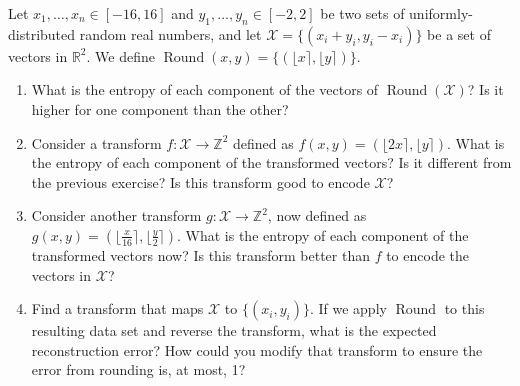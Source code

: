 \begin{exercise}
Let $x_1, \ldots , x_n \in [-16,16]$ and $y_1, \ldots , y_n \in [-2,2]$ be two sets of uniformly-distributed random real numbers, and let $\mathcal{X}=\lbrace (x_i + y_i, y_i - x_i) \rbrace$ be a set of vectors in $\mathbb{R}^2$. We define $\operatorname{Round}(x,y) = \lbrace (\lfloor x \rceil, \lfloor y \rceil ) \rbrace$.
\begin{enumerate}
\item What is the entropy of each component of the vectors of $\operatorname{Round}(\mathcal{X})$? Is it higher for one component than the other?
\item Consider a transform $f : \mathcal{X} \rightarrow \mathbb{Z}^2$ defined as $f(x,y) = (\lfloor 2x \rceil, \lfloor y \rceil)$. What is the entropy of each component of the transformed vectors? Is it different from the previous exercise? Is this transform good to encode $\mathcal{X}$?
\item Consider another transform $g : \mathcal{X} \rightarrow \mathbb{Z}^2$, now defined as $g(x,y) = (\lfloor \frac{x}{16} \rceil, \lfloor \frac{y}{2} \rceil)$. What is the entropy of each component of the transformed vectors now? Is this transform better than $f$ to encode the vectors in $\mathcal{X}$?
\item Find a transform that maps $\mathcal{X}$ to $\lbrace (x_i,y_i) \rbrace$. If we apply $\operatorname{Round}$ to this resulting data set and reverse the transform, what is the expected reconstruction error? How could you modify that transform to ensure the error from rounding is, at most, 1?
\end{enumerate}
\end{exercise}

\vspace{0.25cm}

